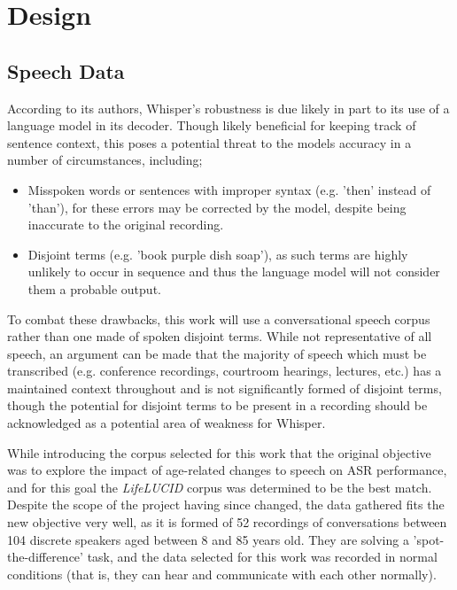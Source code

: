 \chapter{Design}\label{ch:design}

\section{Speech Data}

According to its authors, Whisper's robustness is due likely in part to its use of a language model in its decoder\cite{whisper}.
Though likely beneficial for keeping track of sentence context, this poses a potential threat to the models accuracy in a number of circumstances, including;

\begin{itemize}
  \item Misspoken words or sentences with improper syntax (e.g. 'then' instead of 'than'), for these errors may be corrected by the model, despite being inaccurate to the original recording.
  \item Disjoint terms (e.g. 'book purple dish soap'), as such terms are highly unlikely to occur in sequence and thus the language model will not consider them a probable output.
\end{itemize}

To combat these drawbacks, this work will use a conversational speech corpus rather than one made of spoken disjoint terms.
While not representative of all speech, an argument can be made that the majority of speech which must be transcribed (e.g. conference recordings, courtroom hearings, lectures, etc.) has a maintained context throughout and is not significantly formed of disjoint terms, though the potential for disjoint terms to be present in a recording should be acknowledged as a potential area of weakness for Whisper.

While introducing the corpus selected for this work that the original objective was to explore the impact of age-related changes to speech on ASR performance, and for this goal the \emph{LifeLUCID} corpus\cite{lifelucid} was determined to be the best match.
Despite the scope of the project having since changed, the data gathered fits the new objective very well, as it is formed of 52 recordings of conversations between 104 discrete speakers aged between 8 and 85 years old.
They are solving a 'spot-the-difference' task, and the data selected for this work was recorded in normal conditions (that is, they can hear and communicate with each other normally).

